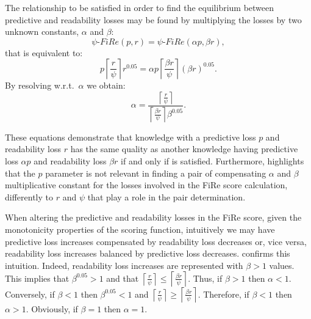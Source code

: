 \documentclass{article}
\newcommand{\fire}{FiRe}
\begin{document}
The relationship to be satisfied in order to find the equilibrium between predictive and readability losses may be found by multiplying the losses by two unknown constants, $\alpha$ and $\beta$:
%
\begin{equation}\label{eq:equi1}
	\psi\textrm{-}\fire(p, r) = \psi\textrm{-}\fire(\alpha p, \beta r),
\end{equation}
%
that is equivalent to:
%
\begin{equation}\label{eq:equi2}
	p \left \lceil{\frac{r}{\psi}}\right \rceil r^{0.05} = \alpha p \left \lceil{\frac{\beta r}{\psi}}\right \rceil (\beta r)^{0.05}.
\end{equation}
%
By resolving w.r.t.\ $\alpha$ we obtain:
%
\begin{equation}\label{eq:alpha}
	\alpha = \frac{\left \lceil{\frac{r}{\psi}}\right \rceil}{\left \lceil{\frac{\beta r}{\psi}}\right \rceil \beta^{0.05}}.
\end{equation}


These equations demonstrate that knowledge with a predictive loss $p$ and readability loss $r$ has the same quality as another knowledge having predictive loss $\alpha p$ and readability loss $\beta r$ if and only if  is satisfied.
%
Furthermore,  highlights that the $p$ parameter is not relevant in finding a pair of compensating $\alpha$ and $\beta$ multiplicative constant for the losses involved in the \fire{} score calculation, differently to $r$ and $\psi$ that play a role in the pair determination.

When altering the predictive and readability losses in the \fire{} score, given the monotonicity properties of the scoring function, intuitively we may have predictive loss increases compensated by readability loss decreases or, vice versa, readability loss increases balanced by predictive loss decreases.
%
 confirms this intuition.
%
Indeed, readability loss increases are represented with $\beta > 1$ values.
%
This implies that $\beta^{0.05} > 1$ and that $\left \lceil{\frac{r}{\psi}}\right \rceil \leq \left \lceil{\frac{\beta r}{\psi}}\right \rceil$.
%
Thus, if $\beta > 1$ then $\alpha < 1$.
%
Conversely, if $\beta < 1$ then $\beta^{0.05} < 1$ and $\left \lceil{\frac{r}{\psi}}\right \rceil \geq \left \lceil{\frac{\beta r}{\psi}}\right \rceil$.
%
Therefore, if $\beta < 1$ then $\alpha > 1$.
%
Obviously, if $\beta = 1$ then $\alpha = 1$.
\end{document}
